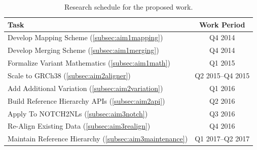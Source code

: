 \documentclass[11pt,proposal]{ucthesis}
\begin{document}
\begin{table}[ht]
    \centering
    \begin{tabular}{l|c}
        \textbf{Task} & \textbf{Work Period} \\
        \hline
        Develop Mapping Scheme (\ref{subsec:aim1mapping}) & Q4 2014 \\
        Develop Merging Scheme (\ref{subsec:aim1merging}) & Q4 2014 \\
        Formalize Variant Mathematics (\ref{subsec:aim1math}) & Q1 2015 \\
        Scale to GRCh38 (\ref{subsec:aim2aligner}) & Q2 2015--Q4 2015 \\
        Add Additional Variation (\ref{subsec:aim2variation}) & Q1 2016 \\
        Build Reference Hierarchy APIs (\ref{subsec:aim2api}) & Q2 2016 \\
        Apply To NOTCH2NLs (\ref{subsec:aim3notch}) & Q3 2016 \\
        Re-Align Existing Data (\ref{subsec:aim3realign}) & Q4 2016 \\
        Maintain Reference Hierarchy (\ref{subsec:aim3maintenance}) & Q1 2017--Q2 2017 \\ 
    \end{tabular}    
    \caption{Research schedule for the proposed work.} 
    \label{tbl:schedule}
\end{table}




\def\baselinestretch{1.0}\large\normalsize



\end{document}
